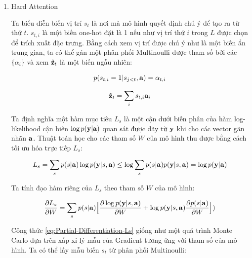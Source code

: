 \documentclass[14pt, a4paper]{article}
\numberwithin{equation}{section}
\numberwithin{algorithm}{section}
\numberwithin{figure}{section}
\numberwithin{dl}{section}
\numberwithin{md}{section}
\numberwithin{bd}{section}
\numberwithin{dn}{section}
\numberwithin{hq}{section}
\begin{document}
    \begin{enumerate}[label=(\alph*)]
        \item Hard Attention

        Ta biểu diễn biến vị trí $s_t$ là nơi mà mô hình quyết định chú ý để tạo ra từ thứ $t$.
        $s_{t, i}$ là một biến one-hot đặt là 1 nếu như vị trí thứ $i$ trong $L$ được chọn để trích xuất đặc trưng.
        Bằng cách xem vị trí được chú ý như là một biến ẩn trung gian, ta có thể gán một phân phối Multinoulli được tham số bởi các $\lbrace \alpha_i \rbrace$ và xem $\hat{\bold{z}}_t$ là một biến ngẫu nhiên:

        \begin{equation}
            p(s_{t, i}=1 \vert s_{j < t}, \bold{a})=\alpha_{t,i}
        \end{equation}

        \begin{equation}
            \hat{\bold{z}}_t = \sum_i s_{t,i}\bold{a}_i
        \end{equation}

        Ta định nghĩa một hàm mục tiêu $L_s$ là một cận dưới biến phân của hàm log-likelihood cận biên $\log p (\bold{y}\vert \bold{a})$ quan sát được dãy từ $\bold{y}$ khi cho các vector gãn nhãn $\bold{a}$.
        Thuật toán học cho các tham số $W$ của mô hình thu được bằng cách tối ưu hóa trực tiếp $L_s$:

        \begin{equation} \label{eq:Ls}
            L_s = \sum_s p(s\vert \bold{a}) \log p(\bold{y}\vert s, \bold{a})\\\leq \log \sum_s p(s \vert \bold{a}) p (\bold{y} \vert s, \bold{a})\\=\log p (\bold{y} \vert \bold{a})
        \end{equation}

        Ta tính đạo hàm riêng của $L_s$ theo tham số $W$ của mô hình:

        \begin{equation} \label{eq:Partial-Differentiation-Ls}
            \dfrac{\partial L_s}{\partial W}=\sum_s p(s \vert \bold{a}) \Big\lbrack \dfrac{\partial \log p(\bold{y} \vert s, \bold{a})}{\partial W} + \log p(\bold{y} \vert s, \bold{a}) \dfrac{\partial p(s \vert \bold{a})}{\partial W} \Big\rbrack)
        \end{equation}

        Công thức \ref{eq:Partial-Differentiation-Ls} giống như một quá trình Monte Carlo dựa trên xấp xỉ lý mẫu của Gradient tương ứng với tham số của mô hình.
        Ta có thể lấy mẫu biến $s_t$ từ phân phối Multinoulli:


\end{enumerate}
\end{document}
